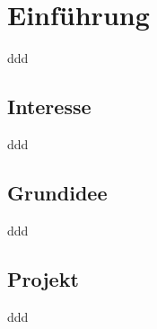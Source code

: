 \chapter{Einführung}
\label{Einführung}
ddd


\section{Interesse}
ddd


\section{Grundidee}
ddd


\section{Projekt}
ddd